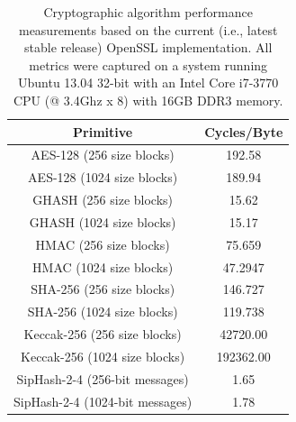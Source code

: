 \documentclass[10pt]{article}
\begin{document}
\begin{table}
\centering
\caption{Cryptographic algorithm performance measurements based on the current (i.e., latest stable release) OpenSSL implementation. All metrics were captured on a system running Ubuntu 13.04 32-bit with an Intel Core i7-3770 CPU (@ 3.4Ghz x 8) with 16GB DDR3 memory.}
\label{tab:our-baseline}
  \begin{tabular}{|c | c |} \hline
  Primitive  & Cycles/Byte \\ \hline
  AES-128 (256 size blocks)     & 192.58 \\ %
  AES-128 (1024 size blocks)    & 189.94 \\ %
  GHASH (256 size blocks)      & 15.62 \\ %
  GHASH (1024 size blocks)     & 15.17 \\ %
  HMAC (256 size blocks)       &  75.659 \\ %
  HMAC (1024 size blocks)       & 47.2947 \\ %
  SHA-256 (256 size blocks)     & 146.727 \\ %
  SHA-256 (1024 size blocks)    & 119.738 \\ %
  Keccak-256 (256 size blocks) & 42720.00 \\
  Keccak-256 (1024 size blocks) & 192362.00 \\
  SipHash-2-4 (256-bit messages) & 1.65 \\ %
  SipHash-2-4 (1024-bit messages) & 1.78 \\ \hline %
  \end{tabular}
\end{table}
\end{document}
